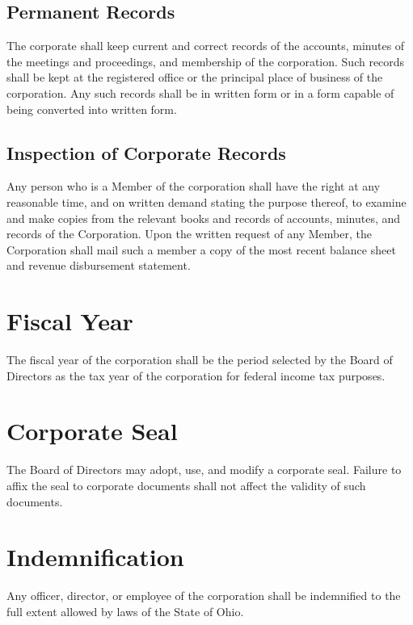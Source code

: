 \documentclass{article}
\begin{document}
\subsection{Permanent Records}
The corporate shall keep current and correct records of the accounts, minutes of the 
meetings and proceedings, and membership of the corporation.  Such records shall be kept 
at the registered office or the principal place of business of the corporation.  Any such 
records shall be in written form or in a form capable of being converted into written form.
\subsection{Inspection of Corporate Records}
Any person who is a Member of the corporation shall have the right at any reasonable time, 
and on written demand stating the purpose thereof, to examine and make copies from the 
relevant books and records of accounts, minutes, and records of the Corporation.  Upon 
the written request of any Member, the Corporation shall mail such a member a copy of the 
most recent balance sheet and revenue disbursement statement.
\section{Fiscal Year}
The fiscal year of the corporation shall be the period selected by the Board of Directors as 
the tax year of the corporation for federal income tax purposes.
\section{Corporate Seal}
The Board of Directors may adopt, use, and modify a corporate seal.  Failure to affix the 
seal to corporate documents shall not affect the validity of such documents.
\section{Indemnification}
Any officer, director, or employee of the corporation shall be indemnified to the full extent 
allowed by laws of the State of Ohio.
\end{document}
